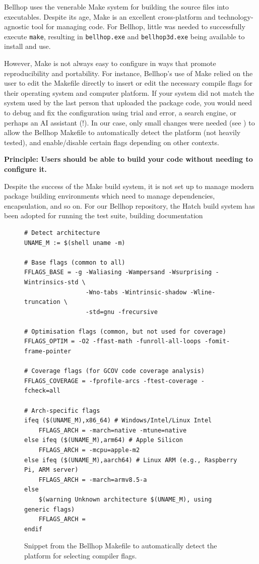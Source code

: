\documentclass[twocolumn]{willarticle}
\newcommand\Principle[1]{\begin{framed}\bfseries Principle: #1\end{framed}}
\begin{document}
Bellhop uses the venerable Make system for building the source files into executables. Despite its age, Make is an excellent cross-platform and technology-agnostic tool for managing code.
For Bellhop, little was needed to successfully execute \verb|make|, resulting in \verb|bellhop.exe| and \verb|bellhop3d.exe| being available to install and use.

However, Make is not always easy to configure in ways that promote reproducibility and portability.
For instance, Bellhop's use of Make relied on the user to edit the Makefile directly to insert or edit the necessary compile flags for their operating system and computer platform.
If your system did not match the system used by the last person that uploaded the package code, you would need to debug and fix the configuration using trial and error, a search engine, or perhaps an AI assistant (!).
In our case, only small changes were needed (see ) to allow the Bellhop Makefile to automatically detect the platform (not heavily tested), and enable/disable certain flags depending on other contexts.

\Principle{Users should be able to build your code without needing to configure it.}

Despite the success of the Make build system, it is not set up to manage modern package building environments which need to manage dependencies, encapsulation, and so on.
For our Bellhop repository, the Hatch build system has been adopted for running the test suite, building documentation 

\begin{figure}
\begin{lstlisting}
# Detect architecture
UNAME_M := $(shell uname -m)

# Base flags (common to all)
FFLAGS_BASE = -g -Waliasing -Wampersand -Wsurprising -Wintrinsics-std \
                 -Wno-tabs -Wintrinsic-shadow -Wline-truncation \
                 -std=gnu -frecursive

# Optimisation flags (common, but not used for coverage)
FFLAGS_OPTIM = -O2 -ffast-math -funroll-all-loops -fomit-frame-pointer

# Coverage flags (for GCOV code coverage analysis)
FFLAGS_COVERAGE = -fprofile-arcs -ftest-coverage -fcheck=all

# Arch-specific flags
ifeq ($(UNAME_M),x86_64) # Windows/Intel/Linux Intel
    FFLAGS_ARCH = -march=native -mtune=native
else ifeq ($(UNAME_M),arm64) # Apple Silicon
    FFLAGS_ARCH = -mcpu=apple-m2
else ifeq ($(UNAME_M),aarch64) # Linux ARM (e.g., Raspberry Pi, ARM server)
    FFLAGS_ARCH = -march=armv8.5-a
else
    $(warning Unknown architecture $(UNAME_M), using generic flags)
    FFLAGS_ARCH =
endif
\end{lstlisting}
\caption{Snippet from the Bellhop Makefile to automatically detect the platform for selecting compiler flags.}
\label{fig:makefile}
\end{figure}
\end{document}
